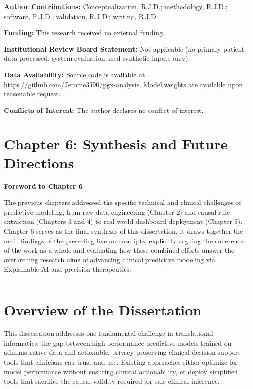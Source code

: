 \documentclass[
  12pt,
]{book}
\begin{document}
\textbf{Author Contributions:} Conceptualization, R.J.D.; methodology,
R.J.D.; software, R.J.D.; validation, R.J.D.; writing, R.J.D.

\textbf{Funding:} This research received no external funding.

\textbf{Institutional Review Board Statement:} Not applicable (no
primary patient data processed; system evaluation used synthetic inputs
only).

\textbf{Data Availability:} Source code is available at
https://github.com/Jerome3590/pgx-analysis. Model weights are available
upon reasonable request.

\textbf{Conflicts of Interest:} The author declares no conflict of
interest.

\cleardoublepage

\chapter{Chapter 6: Synthesis and Future Directions}\label{chap-6}

\textbf{Foreword to Chapter 6}

The previous chapters addressed the specific technical and clinical
challenges of predictive modeling, from raw data engineering (Chapter 2)
and causal rule extraction (Chapters 3 and 4) to real-world dashboard
deployment (Chapter 5). Chapter 6 serves as the final synthesis of this
dissertation. It draws together the main findings of the preceding five
manuscripts, explicitly arguing the coherence of the work as a whole and
evaluating how these combined efforts answer the overarching research
aims of advancing clinical predictive modeling via Explainable AI and
precision therapeutics.

\begin{center}\rule{0.5\linewidth}{0.5pt}\end{center}

\chapter{Overview of the Dissertation}\label{sec-overview}

This dissertation addresses one fundamental challenge in translational
informatics: the gap between high-performance predictive models trained
on administrative data and actionable, privacy-preserving clinical
decision support tools that clinicians can trust and use. Existing
approaches either optimize for model performance without ensuring
clinical actionability, or deploy simplified tools that sacrifice the
causal validity required for safe clinical inference.
\end{document}
